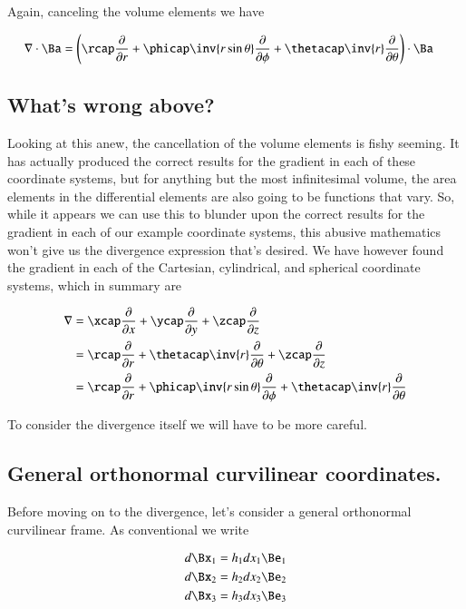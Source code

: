 Again, canceling the volume elements we have

\begin{align}\label{eqn:sphericalGradDot}
\grad \cdot \Ba &=
\left(\rcap \PD{r}{}
+\phicap \inv{r \sin\theta} \PD{\phi}{}
+\thetacap \inv{r} \PD{\theta}{}
\right) \cdot \Ba
\end{align}

\subsection{What's wrong above?}

Looking at this anew, the cancellation of the volume elements is fishy seeming.  It has actually produced the correct results for the gradient in each of these coordinate systems, but for anything but the most infinitesimal volume, the area elements in the differential elements are also going to be functions that vary.  So, while it appears we can use this to blunder upon the correct results for the gradient in each of our example coordinate systems, this abusive mathematics won't give us the divergence expression that's desired.  We have however found the gradient in each of the Cartesian, cylindrical, and spherical coordinate systems, which in summary are

\begin{align}\label{eqn:gradientExampleSummary}
\grad
&= \xcap \PD{x}{} +\ycap \PD{y}{} +\zcap \PD{z}{} \\
&= \rcap \PD{r}{} +\thetacap \inv{r} \PD{\theta}{} + \zcap \PD{z}{} \\
&= \rcap \PD{r}{} +\phicap \inv{r \sin\theta} \PD{\phi}{} +\thetacap \inv{r} \PD{\theta}{}
\end{align}

To consider the divergence itself we will have to be more careful.

\subsection{General orthonormal curvilinear coordinates.}

Before moving on to the divergence, let's consider a general orthonormal curvilinear frame.  As conventional we write

\begin{align*}
d\Bx_1 &= h_1 dx_1 \Be_1 \\
d\Bx_2 &= h_2 dx_2 \Be_2 \\
d\Bx_3 &= h_3 dx_3 \Be_3
\end{align*}

